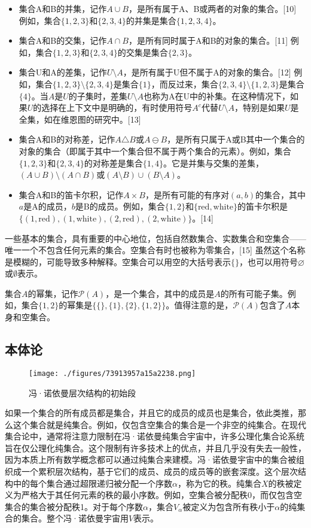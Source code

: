 \begin{itemize}
\item 集合A和B的并集，记作$A \cup B$，是所有属于A、B或两者的对象的集合。[10] 例如，集合$\{1, 2, 3\}$和$\{2, 3, 4\}$的并集是集合$\{1, 2, 3, 4\}$。
\item 集合A和B的交集，记作$A \cap B$，是所有同时属于A和B的对象的集合。[11] 例如，集合$\{1, 2, 3\}$和$\{2, 3, 4\}$的交集是集合$\{2, 3\}$。
\item 集合U和A的差集，记作$U \setminus A$，是所有属于U但不属于A的对象的集合。[12] 例如，集合$\{1, 2, 3\} \setminus \{2, 3, 4\}$是集合$\{1\}$，而反过来，集合$\{2, 3, 4\} \setminus \{1, 2, 3\}$是集合$\{4\}$。当$A$是$U$的子集时，差集$U \setminus A$也称为A在U中的补集。在这种情况下，如果$U$的选择在上下文中是明确的，有时使用符号$A^c$代替$U \setminus A$，特别是如果$U$是全集，如在维恩图的研究中。[13]
\item 集合A和B的对称差，记作$A \triangle B$或$A \ominus B$，是所有只属于A或B其中一个集合的对象的集合（即属于其中一个集合但不属于两个集合的元素）。例如，集合$\{1, 2, 3\}$和$\{2, 3, 4\}$的对称差是集合$\{1, 4\}$。它是并集与交集的差集，$(A \cup B) \setminus (A \cap B)$或$(A \setminus B) \cup (B \setminus A)$。
\item 集合A和B的笛卡尔积，记作$A \times B$，是所有可能的有序对$(a, b)$的集合，其中$a$是A的成员，$b$是B的成员。例如，集合$\{1, 2\}$和$\{\text{red}, \text{white}\}$的笛卡尔积是$\{(1, \text{red}), (1, \text{white}), (2, \text{red}), (2, \text{white})\}$。[14]
\end{itemize}
一些基本的集合，具有重要的中心地位，包括自然数集合、实数集合和空集合——唯一一个不包含任何元素的集合。空集合有时也被称为零集合，[15] 虽然这个名称是模糊的，可能导致多种解释。空集合可以用空的大括号表示$\{\}$，也可以用符号$\varnothing$或$\emptyset$表示。

集合$A$的幂集，记作${\mathcal {P}}(A)$，是一个集合，其中的成员是$A$的所有可能子集。例如，集合$\{1, 2\}$的幂集是$\{\{\}, \{1\}, \{2\}, \{1, 2\}\}$。值得注意的是，${\mathcal {P}}(A)$包含了$A$本身和空集合。
\subsection{本体论}
\begin{figure}[ht]
\centering
\texttt{[image: ./figures/73913957a15a2238.png]}
\caption{冯·诺依曼层次结构的初始段} \label{fig_Set1_6}
\end{figure}
如果一个集合的所有成员都是集合，并且它的成员的成员也是集合，依此类推，那么这个集合就是纯集合。例如，仅包含空集合的集合是一个非空的纯集合。在现代集合论中，通常将注意力限制在冯·诺依曼纯集合宇宙中，许多公理化集合论系统旨在仅公理化纯集合。这个限制有许多技术上的优点，并且几乎没有失去一般性，因为本质上所有数学概念都可以通过纯集合来建模。冯·诺依曼宇宙中的集合被组织成一个累积层次结构，基于它们的成员、成员的成员等的嵌套深度。这个层次结构中的每个集合通过超限递归被分配一个序数$\alpha$，称为它的秩。纯集合$X$的秩被定义为严格大于其任何元素的秩的最小序数。例如，空集合被分配秩0，而仅包含空集合的集合被分配秩1。对于每个序数$\alpha$，集合$V_{\alpha}$被定义为包含所有秩小于$\alpha$的纯集合的集合。整个冯·诺依曼宇宙用$V$表示。
